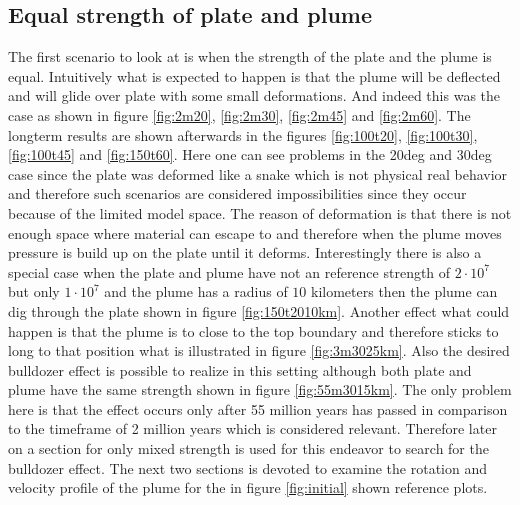 \documentclass[12pt]{scrreprt}
\begin{document}
\subsection{Equal strength of plate and plume}
The first scenario to look at is when the strength of the plate and the plume is equal. Intuitively what is expected to happen is that the plume will be deflected and will glide over plate with some small deformations. And indeed this was the case as shown in figure \ref{fig:2m20}, \ref{fig:2m30}, \ref{fig:2m45} and \ref{fig:2m60}. The longterm results are shown afterwards in the figures \ref{fig:100t20}, \ref{fig:100t30}, \ref{fig:100t45} and \ref{fig:150t60}. Here one can see problems in the 20deg and 30deg case since the plate was deformed like a snake which is not physical real behavior and therefore such scenarios are considered impossibilities since they occur because of the limited model space. The reason of deformation is that there is not enough space where material can escape to and therefore when the plume moves pressure is build up on the plate until it deforms. Interestingly there is also a special case when the plate and plume have not an reference strength of $2\cdot 10^7$ but only $1\cdot 10^7$ and the plume has a radius of $10$ kilometers then the plume can dig through the plate shown in figure \ref{fig:150t2010km}. Another effect what could happen is that the plume is to close to the top boundary and therefore sticks to long to that position what is illustrated in figure \ref{fig:3m3025km}. Also the desired bulldozer effect is possible to realize in this setting although both plate and plume have the same strength shown in figure \ref{fig:55m3015km}. The only problem here is that the effect occurs only after 55 million years has passed in comparison to the timeframe of 2 million years which is considered relevant. Therefore later on a section for only mixed strength is used for this endeavor to search for the bulldozer effect. The next two sections is devoted to examine the rotation and velocity profile of the plume for the in figure \ref{fig:initial} shown reference plots.
\end{document}
